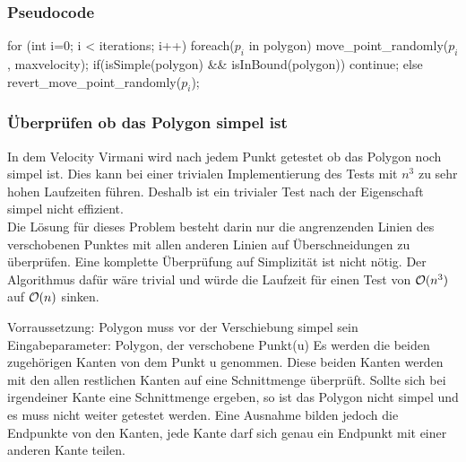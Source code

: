 \subsubsection{Pseudocode}

\begin{code}[mathescape=true]
for (int i=0; i < iterations; i++)
{
	foreach($p_i$ in polygon)
	{
		move_point_randomly($p_i$, maxvelocity);
		if(isSimple(polygon) && isInBound(polygon))
			continue;
		else
			revert_move_point_randomly($p_i$);
	}
}
\end{code}

\subsubsection{Überprüfen ob das Polygon simpel ist}
In dem Velocity Virmani wird nach jedem Punkt getestet ob das Polygon noch simpel ist. Dies kann bei einer trivialen Implementierung des Tests mit $n^3$ zu sehr hohen Laufzeiten führen.
Deshalb ist ein trivialer Test nach der Eigenschaft simpel nicht effizient.\smallskip \\ 
Die Lösung für dieses Problem besteht darin nur die angrenzenden Linien des verschobenen Punktes mit allen anderen Linien auf Überschneidungen zu überprüfen. Eine komplette Überprüfung auf Simplizität ist nicht nötig.
Der Algorithmus dafür wäre trivial und würde die Laufzeit für einen Test von $\mathcal{O}(n^3)$ auf $\mathcal{O}(n)$ sinken.

Vorraussetzung: Polygon muss vor der Verschiebung simpel sein
Eingabeparameter: Polygon, der verschobene Punkt(u)
Es werden die beiden zugehörigen Kanten von dem Punkt u genommen. Diese beiden Kanten werden mit den allen restlichen Kanten auf eine Schnittmenge überprüft. Sollte sich bei irgendeiner Kante eine Schnittmenge ergeben, so ist das Polygon nicht simpel und es muss nicht weiter getestet werden. Eine Ausnahme bilden jedoch die Endpunkte von den Kanten, jede Kante darf sich genau ein Endpunkt mit einer anderen Kante teilen.


